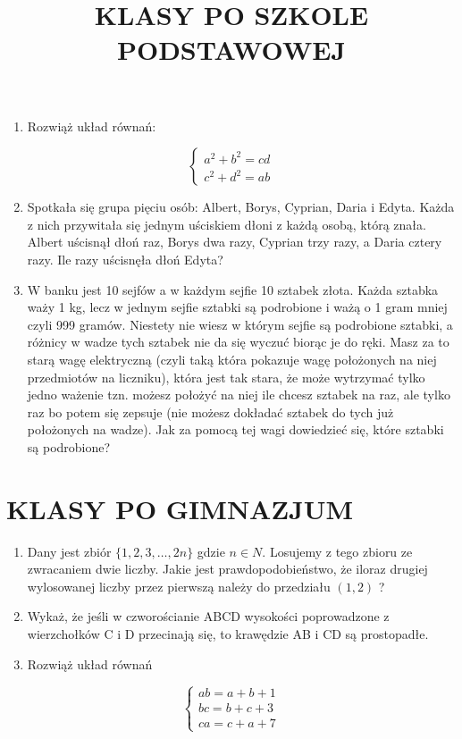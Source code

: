 \documentclass[10pt]{article}
\title{KLASY PO SZKOLE PODSTAWOWEJ }
\author{}
\date{}
\begin{document}
\maketitle
\begin{enumerate}
  \item Rozwiąż układ równań:
\end{enumerate}

\[
\left\{\begin{array}{l}
a^{2}+b^{2}=c d \\
c^{2}+d^{2}=a b
\end{array}\right.
\]

\begin{enumerate}
  \setcounter{enumi}{1}
  \item Spotkała się grupa pięciu osób: Albert, Borys, Cyprian, Daria i Edyta. Każda z nich przywitała się jednym uściskiem dłoni z każdą osobą, którą znała. Albert uścisnął dłoń raz, Borys dwa razy, Cyprian trzy razy, a Daria cztery razy. Ile razy uścisnęła dłoń Edyta?
  \item W banku jest 10 sejfów a w każdym sejfie 10 sztabek złota. Każda sztabka waży 1 kg, lecz w jednym sejfie sztabki są podrobione i ważą o 1 gram mniej czyli 999 gramów. Niestety nie wiesz w którym sejfie są podrobione sztabki, a różnicy w wadze tych sztabek nie da się wyczuć biorąc je do ręki. Masz za to starą wagę elektryczną (czyli taką która pokazuje wagę położonych na niej przedmiotów na liczniku), która jest tak stara, że może wytrzymać tylko jedno ważenie tzn. możesz położyć na niej ile chcesz sztabek na raz, ale tylko raz bo potem się zepsuje (nie możesz dokładać sztabek do tych już położonych na wadze). Jak za pomocą tej wagi dowiedzieć się, które sztabki są podrobione?
\end{enumerate}

\section*{KLASY PO GIMNAZJUM}
\begin{enumerate}
  \item Dany jest zbiór \(\{1,2,3, \ldots, 2 n\}\) gdzie \(n \in N\). Losujemy z tego zbioru ze zwracaniem dwie liczby. Jakie jest prawdopodobieństwo, że iloraz drugiej wylosowanej liczby przez pierwszą należy do przedziału \((1,2)\) ?
  \item Wykaż, że jeśli w czworościanie ABCD wysokości poprowadzone z wierzchołków C i D przecinają się, to krawędzie AB i CD są prostopadłe.
  \item Rozwiąż układ równań
\end{enumerate}

\[
\left\{\begin{array}{l}
a b=a+b+1 \\
b c=b+c+3 \\
c a=c+a+7
\end{array}\right.
\]
\end{document}
